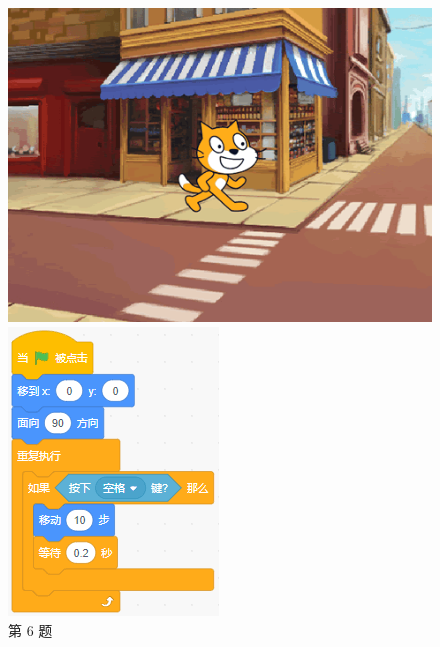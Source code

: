\documentclass[10pt, a4paper]{article}
\begin{document}
\begin{enumerate}
\begin{figure}[htbp]
\begin{minipage}[t]{.3\textwidth}
\begin{minipage}[t]{.55\textwidth}
                    \includegraphics[width=\textwidth]{figure/6-1.png}
                \end{minipage}
                \begin{minipage}[t]{.4\textwidth}
                    \centering
                    \includegraphics[width=\textwidth]{figure/6-2.png}
                \end{minipage}
                \caption*{第 6 题}
            \end{minipage}
        \end{figure}


\end{enumerate}
\end{document}

